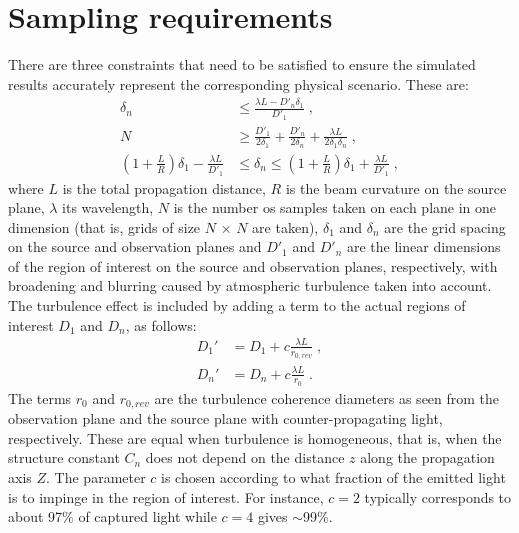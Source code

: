 \documentclass[12pt]{article}
\begin{document}
\section{Sampling requirements}
There are three constraints that need to be satisfied to ensure the simulated results accurately represent the corresponding physical scenario. These are:
\begin{subequations}
\begin{align}
\delta_n &\leq \frac{\lambda L - D'_n \delta_1}{D'_1} \; , \label{constraint1} \\
N &\geq \frac{D'_1}{2\delta_1}+\frac{D'_n}{2\delta_n} + \frac{\lambda L}{2\delta_1\delta_n} \; , \label{constraint2} \\
\left( 1+\frac{L}{R}\right) \delta_1 -\frac{\lambda L}{D'_1} & \leq \delta_n \leq  \left( 1+\frac{L}{R}\right) \delta_1 + \frac{\lambda L}{D'_1} \; ,
\end{align}
\label{constraints1to3}
\end{subequations}
where $L$ is the total propagation distance, $R$ is the beam curvature on the source plane, $\lambda$ its wavelength, $N$ is the number os samples taken on each plane in one dimension (that is, grids of size $N\,\times\,N$ are taken), $\delta_1$ and $\delta_n$ are the grid spacing on the source and observation planes and $D'_1$ and $D'_n$ are the linear dimensions of the region of interest on the source and observation planes, respectively, with broadening and blurring caused by atmospheric turbulence taken into account. The turbulence effect is included by adding a term to the actual regions of interest $D_1$ and $D_n$, as follows:
\begin{subequations}
\begin{align}
D_1' &= D_1 +c\frac{\lambda L}{r_{0,rev}} \; , \\
D_n' &= D_n +c\frac{\lambda L}{r_0} \; .
\end{align}
\end{subequations}
The terms $r_0$ and $r_{0,rev}$ are the turbulence coherence diameters as seen from the observation plane and the source plane with counter-propagating light, respectively. These are equal when turbulence is homogeneous, that is, when the structure constant $C_n$ does not depend on the distance $z$ along the propagation axis $Z$. The parameter $c$ is chosen according to what fraction of the emitted light is to impinge in the region of interest. For instance, $c=2$ typically corresponds to about 97$\%$ of captured light while $c=4$ gives $\sim$99$\%$.
\end{document}
